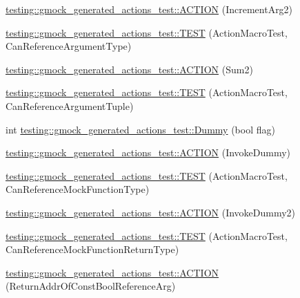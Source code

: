 \begin{DoxyCompactItemize}
\item 
\mbox{\hyperlink{namespacetesting_1_1gmock__generated__actions__test_aa2c56f5c6a770b252ebdc27a6d8b613d}{testing\+::gmock\+\_\+generated\+\_\+actions\+\_\+test\+::\+A\+C\+T\+I\+ON}} (Increment\+Arg2)
\item 
\mbox{\hyperlink{namespacetesting_1_1gmock__generated__actions__test_abdfd8146dfbb5a152326a851b13e45cb}{testing\+::gmock\+\_\+generated\+\_\+actions\+\_\+test\+::\+T\+E\+ST}} (Action\+Macro\+Test, Can\+Reference\+Argument\+Type)
\item 
\mbox{\hyperlink{namespacetesting_1_1gmock__generated__actions__test_a108b4ee75c3b13445b7035fd5ecd6d6d}{testing\+::gmock\+\_\+generated\+\_\+actions\+\_\+test\+::\+A\+C\+T\+I\+ON}} (Sum2)
\item 
\mbox{\hyperlink{namespacetesting_1_1gmock__generated__actions__test_a4e2d8b9ac63b2f6dc6d4b17c3a767dee}{testing\+::gmock\+\_\+generated\+\_\+actions\+\_\+test\+::\+T\+E\+ST}} (Action\+Macro\+Test, Can\+Reference\+Argument\+Tuple)
\item 
int \mbox{\hyperlink{namespacetesting_1_1gmock__generated__actions__test_ab91824b86c842e024337b6de45eb8cdc}{testing\+::gmock\+\_\+generated\+\_\+actions\+\_\+test\+::\+Dummy}} (bool flag)
\item 
\mbox{\hyperlink{namespacetesting_1_1gmock__generated__actions__test_ae6806220035fcf097362dd736db4b03b}{testing\+::gmock\+\_\+generated\+\_\+actions\+\_\+test\+::\+A\+C\+T\+I\+ON}} (Invoke\+Dummy)
\item 
\mbox{\hyperlink{namespacetesting_1_1gmock__generated__actions__test_a1d3b8bb25c79d7e2167234f87935ea1e}{testing\+::gmock\+\_\+generated\+\_\+actions\+\_\+test\+::\+T\+E\+ST}} (Action\+Macro\+Test, Can\+Reference\+Mock\+Function\+Type)
\item 
\mbox{\hyperlink{namespacetesting_1_1gmock__generated__actions__test_a9f274ffcf4211cb03b4390cb0cc1ef1c}{testing\+::gmock\+\_\+generated\+\_\+actions\+\_\+test\+::\+A\+C\+T\+I\+ON}} (Invoke\+Dummy2)
\item 
\mbox{\hyperlink{namespacetesting_1_1gmock__generated__actions__test_a384a114235b474bb4318754e0d16f559}{testing\+::gmock\+\_\+generated\+\_\+actions\+\_\+test\+::\+T\+E\+ST}} (Action\+Macro\+Test, Can\+Reference\+Mock\+Function\+Return\+Type)
\item 
\mbox{\hyperlink{namespacetesting_1_1gmock__generated__actions__test_a78725817afcd5d7f19df2bdc2d41b9db}{testing\+::gmock\+\_\+generated\+\_\+actions\+\_\+test\+::\+A\+C\+T\+I\+ON}} (Return\+Addr\+Of\+Const\+Bool\+Reference\+Arg)

\end{DoxyCompactItemize}
